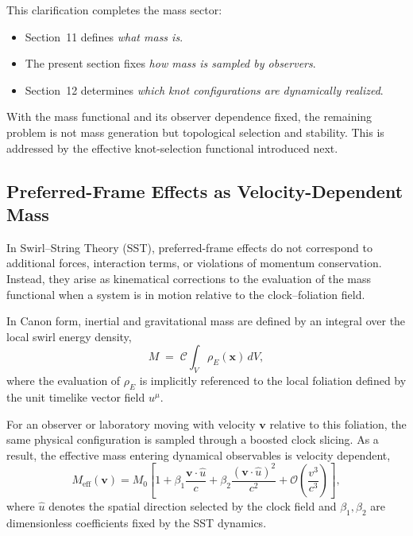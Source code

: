 \documentclass[10pt]{article}
\begin{document}
        This clarification completes the mass sector:
        \begin{itemize}
            \item Section~11 defines \emph{what mass is}.
            \item The present section fixes \emph{how mass is sampled by observers}.
            \item Section~12 determines \emph{which knot configurations are dynamically realized}.
        \end{itemize}

        With the mass functional and its observer dependence fixed,
        the remaining problem is not mass generation but topological
        selection and stability.
        This is addressed by the effective knot-selection functional
        introduced next.

    \subsection{Preferred-Frame Effects as Velocity-Dependent Mass}
    \label{sec:canon_preferred_frame_mass}

    In Swirl--String Theory (SST), preferred-frame effects do not correspond to
    additional forces, interaction terms, or violations of momentum conservation.
    Instead, they arise as kinematical corrections to the evaluation of the
    mass functional when a system is in motion relative to the clock--foliation
    field.

    In Canon form, inertial and gravitational mass are defined by an integral
    over the local swirl energy density,
    \begin{equation}
        M \;=\; \mathcal{C} \int_V \rho_{\!E}(\mathbf{x})\, dV ,
    \end{equation}
    where the evaluation of $\rho_{\!E}$ is implicitly referenced to the local
    foliation defined by the unit timelike vector field $u^\mu$.

    For an observer or laboratory moving with velocity $\mathbf{v}$ relative to
    this foliation, the same physical configuration is sampled through a boosted
    clock slicing. As a result, the effective mass entering dynamical observables
    is velocity dependent,
    \begin{equation}
        M_{\mathrm{eff}}(\mathbf{v})
        =
        M_0
        \left[
            1
            + \beta_1 \frac{\mathbf{v}\!\cdot\!\hat{u}}{c}
            + \beta_2 \frac{(\mathbf{v}\!\cdot\!\hat{u})^2}{c^2}
            + \mathcal{O}\!\left(\frac{v^3}{c^3}\right)
        \right],
    \end{equation}
    where $\hat{u}$ denotes the spatial direction selected by the clock field and
    $\beta_1,\beta_2$ are dimensionless coefficients fixed by the SST dynamics.
\end{document}
